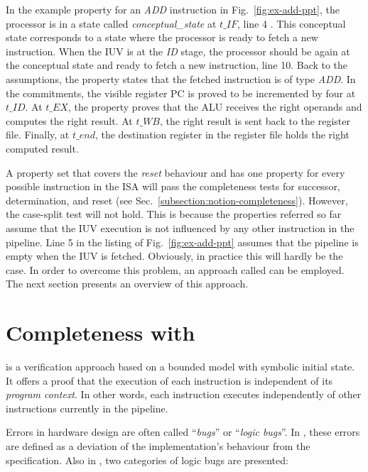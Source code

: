 In the example property for an \textit{ADD} instruction in Fig.~\ref{fig:ex-add-ppt}, the processor  is in a state called \textit{conceptual\_state} at $t\_IF$, line 4 . This conceptual state corresponds to a state where the processor is ready to fetch a new instruction. When the IUV is at the \textit{ID} stage, the processor should be again at the conceptual state and ready to fetch a new instruction, line 10. Back to the assumptions, the property states that the fetched instruction is of type \textit{ADD}. In the commitments, the visible register PC is proved to be incremented by four at $t\_ID$. At $t\_EX$, the property proves that the ALU receives the right operands and computes the right result. At $t\_WB$, the right result is sent back to the register file. Finally, at $t\_end$, the destination register in the register file holds the right computed result.

A property set that covers the \textit{reset} behaviour and has one property for every possible instruction in the ISA will pass the completeness tests for successor, determination, and reset (see Sec.~\ref{subsection:notion-completeness}). However, the case-split test will not hold. This is because the properties referred so far assume that the IUV execution is not influenced by any other instruction in the pipeline. Line 5 in the listing of Fig.~\ref{fig:ex-add-ppt} assumes that the pipeline is empty when the IUV is fetched. Obviously, in practice this will hardly be the case. In order to overcome this problem, an approach called \SSQED{} \cite{paper-symbolic} can be employed. The next section presents an overview of this approach.

\section{Completeness with \SSQED{}}
\label{section:s2qed}

\SSQED{} \cite{paper-symbolic} is a verification approach based on a bounded model with symbolic initial state. It offers a proof that the execution of each instruction is independent of its \textit{program context}. In other words, each instruction executes independently of other instructions currently in the pipeline. 

Errors in hardware design are often called “\textit{bugs}” or “\textit{logic bugs}”. In \cite{paper-gapfree}, these errors are defined as a deviation of the implementation’s behaviour from the specification. Also in \cite{paper-gapfree}, two categories of logic bugs are presented:

